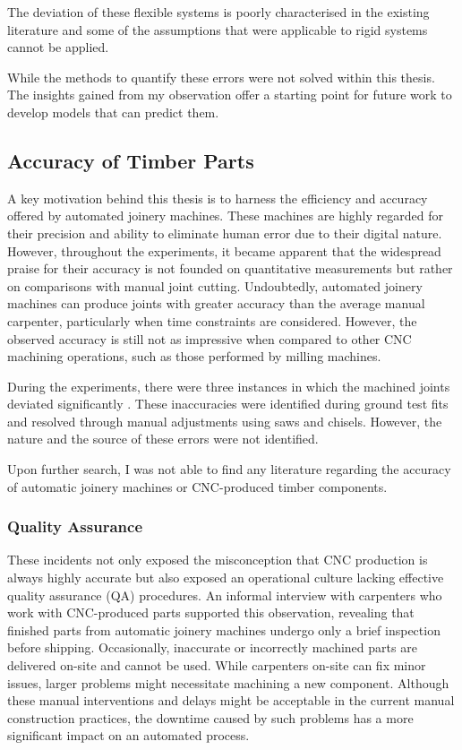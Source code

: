 The deviation of these flexible systems is poorly characterised in the existing literature and some of the assumptions that were applicable to rigid systems cannot be applied. 

While the methods to quantify these errors were not solved within this thesis. The insights gained from my observation offer a starting point for future work to develop models that can predict them. 

\subsection{Accuracy of Timber Parts}
\label{subsection:new_hypo_accuracy_of_timber_parts}

A key motivation behind this thesis is to harness the efficiency and accuracy offered by automated joinery machines. These machines are highly regarded for their precision and ability to eliminate human error due to their digital nature. However, throughout the experiments, it became apparent that the widespread praise for their accuracy is not founded on quantitative measurements but rather on comparisons with manual joint cutting. Undoubtedly, automated joinery machines can produce joints with greater accuracy than the average manual carpenter, particularly when time constraints are considered. However, the observed accuracy is still not as impressive when compared to other CNC machining operations, such as those performed by milling machines.

During the experiments, there were three instances in which the machined joints deviated significantly . These inaccuracies were identified during ground test fits and resolved through manual adjustments using saws and chisels. However, the nature and the source of these errors were not identified. 

Upon further search, I was not able to find any literature regarding the accuracy of automatic joinery machines or CNC-produced timber components.

\subsubsection{Quality Assurance}
\label{subsubsection:new_hypo_quality_assurance}

These incidents not only exposed the misconception that CNC production is always highly accurate but also exposed an operational culture lacking effective quality assurance (QA) procedures. An informal interview with carpenters who work with CNC-produced parts supported this observation, revealing that finished parts from automatic joinery machines undergo only a brief inspection before shipping. Occasionally, inaccurate or incorrectly machined parts are delivered on-site and cannot be used. While carpenters on-site can fix minor issues, larger problems might necessitate machining a new component. Although these manual interventions and delays might be acceptable in the current manual construction practices, the downtime caused by such problems has a more significant impact on an automated process.

